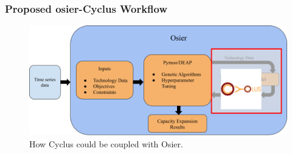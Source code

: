 \begin{frame}
    \frametitle{Proposed \Gls{osier}-Cyclus Workflow}
    \begin{figure}[htbp!]
    \centering
    \includegraphics[width=\columnwidth]{figures/osier_flow_cyclus}
    \caption{How Cyclus could be coupled with Osier.}
    \label{fig:osier_flow_cyclus}
\end{figure}
\end{frame}